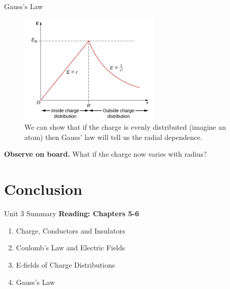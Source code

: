 \documentclass{beamer}
\begin{document}
\begin{frame}{Gauss's Law}
\begin{figure}
\centering
\includegraphics[width=0.6\textwidth]{figures/charge3D.png}
\caption{\label{fig:charge3D} We can show that if the charge is evenly distributed (imagine an atom) then Gauss' law will tell us the radial dependence.}
\end{figure}
\textbf{Observe on board.} What if the charge now varies with radius? 
\end{frame}

\section{Conclusion}

\begin{frame}{Unit 3 Summary}
\textbf{Reading: Chapters 5-6}
\begin{enumerate}
\item Charge, Conductors and Insulators
\item Coulomb's Law and Electric Fields
\item E-fields of Charge Distributions
\item Gauss's Law
\end{enumerate}
\end{frame}
\end{document}
